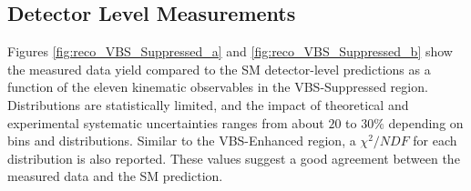 \subsection{Detector Level Measurements}
\label{appendix:VBSSupReco}

Figures \ref{fig:reco_VBS_Suppressed_a} and \ref{fig:reco_VBS_Suppressed_b} show the measured data yield compared to the SM detector-level predictions as a function of the eleven kinematic observables in the VBS-Suppressed region. Distributions are statistically limited, and the impact of theoretical and experimental systematic uncertainties ranges from about $20$ to $30\%$ depending on bins and distributions. Similar to the VBS-Enhanced region, a $\chi^2/NDF$ for each distribution is also reported. These values suggest a good agreement between the measured data and the SM prediction. 

